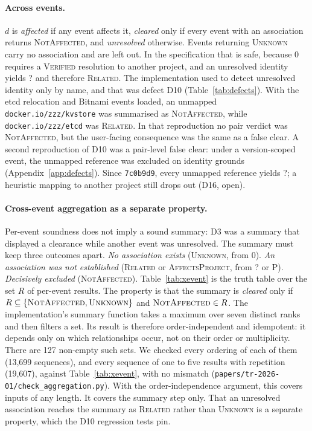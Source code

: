 \documentclass[11pt,a4paper]{article}
\newcommand{\code}[1]{\texttt{#1}}
\newcommand{\Ind}{\textsf{?}}
\newcommand{\Proj}{\textsf{P}}
\newcommand{\NoA}{\textsf{0}}
\newcommand{\dninecommit}{\code{7c0b9d9}}
\begin{document}
\paragraph{Across events.} $d$ is \emph{affected} if any event affects
it, \emph{cleared} only if every event with an association returns
\textsc{NotAffected}, and \emph{unresolved} otherwise. Events returning
\textsc{Unknown} carry no association and are left out. In the
specification that is safe, because \NoA{} requires a \textsc{Verified}
resolution to another project, and an unresolved identity yields \Ind{}
and therefore \textsc{Related}. The implementation used to detect
unresolved identity only by name, and that was defect D10
(Table~\ref{tab:defects}). With the etcd relocation and Bitnami events
loaded, an unmapped \code{docker.io/zzz/kvstore} was summarised as
\textsc{NotAffected}, while \code{docker.io/zzz/etcd} was
\textsc{Related}. In that reproduction no pair verdict was
\textsc{NotAffected}, but the user-facing consequence was the same as
a false clear. A second reproduction of D10 was a pair-level false
clear: under a version-scoped event, the unmapped reference was
excluded on identity grounds (Appendix~\ref{app:defects}). Since
\dninecommit{}, every unmapped reference yields \Ind{}; a heuristic
mapping to another project still drops out (D16, open).

\paragraph{Cross-event aggregation as a separate property.} Per-event
soundness does not imply a sound summary: D3 was a summary that
displayed a clearance while another event was unresolved. The summary
must keep three outcomes apart. \emph{No association exists}
(\textsc{Unknown}, from \NoA{}). \emph{An association was not
established} (\textsc{Related} or \textsc{AffectsProject}, from
\Ind{} or \Proj{}). \emph{Decisively excluded} (\textsc{NotAffected}).
Table~\ref{tab:xevent} is the truth table over the set $R$ of
per-event results. The property is that the summary is \emph{cleared}
only if $R \subseteq \{\textsc{NotAffected}, \textsc{Unknown}\}$ and
$\textsc{NotAffected} \in R$. The implementation's summary function
takes a maximum over seven distinct ranks and then filters a set.
Its result is therefore order-independent and idempotent: it depends
only on which relationships occur, not on their order or multiplicity.
There are 127 non-empty such sets. We checked every ordering of each
of them (13{,}699 sequences), and every sequence of one to five results
with repetition (19{,}607), against Table~\ref{tab:xevent}, with no
mismatch (\code{papers/tr-2026-01/check\_aggregation.py}). With the
order-independence argument, this covers inputs of any length. It
covers the summary step only. That an unresolved association reaches
the summary as \textsc{Related} rather than \textsc{Unknown} is a
separate property, which the D10 regression tests pin.
\end{document}
